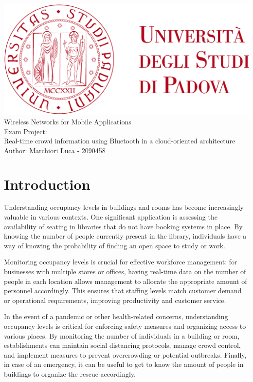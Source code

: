 \documentclass[a4paper, 11pt]{article}
\begin{document}
\begin{titlepage}
	\begin{center}
		\includegraphics[scale=0.1]{images/unipd_logo.png}\\		
		\vspace{4\baselineskip}
		\Huge Wireless Networks for Mobile Applications\\
        \vspace{4\baselineskip}
		\LARGE Exam Project: \\
        Real-time crowd information using Bluetooth in a cloud-oriented architecture\\
		\vfill
		Author: Marchiori Luca - 2090458\\
	\end{center}
\end{titlepage}


\tableofcontents

\newpage
\section{Introduction}
Understanding occupancy levels in buildings and rooms has become increasingly valuable in various contexts. One significant application is assessing the availability of seating in libraries that do not have booking systems in place. By knowing the number of people currently present in the library, individuals have a way of knowing the probability of finding an open space to study or work. 

Monitoring occupancy levels is crucial for effective workforce management: for businesses with multiple stores or offices, having real-time data on the number of people in each location allows management to allocate the appropriate amount of personnel accordingly. This ensures that staffing levels match customer demand or operational requirements, improving productivity and customer service.

In the event of a pandemic or other health-related concerns, understanding occupancy levels is critical for enforcing safety measures and organizing access to various places. By monitoring the number of individuals in a building or room, establishments can maintain social distancing protocols, manage crowd control, and implement measures to prevent overcrowding or potential outbreaks. Finally, in case of an emergency, it can be useful to get to know the amount of people in buildings to organize the rescue accordingly.
\end{document}
